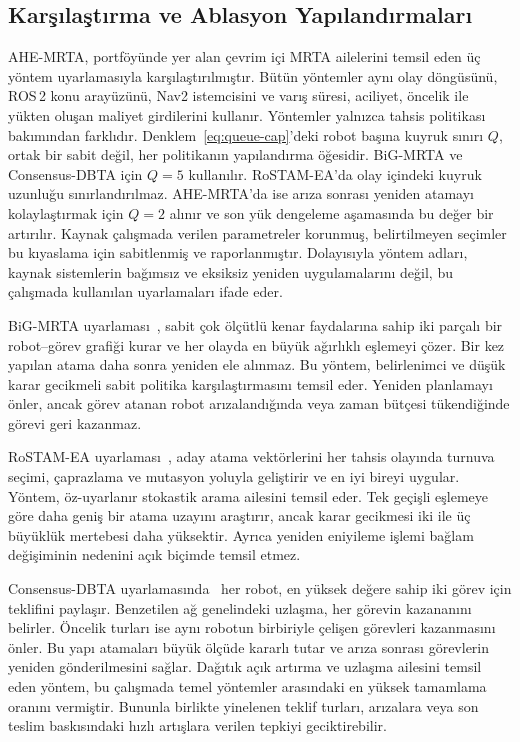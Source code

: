 \documentclass[10pt,letterpaper,onecolumn]{IEEEtran}
\begin{document}
\subsection{Karşılaştırma ve Ablasyon Yapılandırmaları}
\label{sec:baselines}
AHE-MRTA, portföyünde yer alan çevrim içi MRTA ailelerini temsil eden üç yöntem
uyarlamasıyla karşılaştırılmıştır. Bütün yöntemler aynı olay döngüsünü, ROS\,2
konu arayüzünü, Nav2 istemcisini ve varış süresi, aciliyet, öncelik ile yükten
oluşan maliyet girdilerini kullanır. Yöntemler yalnızca tahsis politikası
bakımından farklıdır. Denklem~\eqref{eq:queue-cap}'deki robot başına kuyruk
sınırı $Q$, ortak bir sabit değil, her politikanın yapılandırma öğesidir.
BiG-MRTA ve Consensus-DBTA için $Q{=}5$ kullanılır. RoSTAM-EA'da olay içindeki
kuyruk uzunluğu sınırlandırılmaz. AHE-MRTA'da ise arıza sonrası yeniden atamayı
kolaylaştırmak için $Q{=}2$ alınır ve son yük dengeleme aşamasında bu değer bir
artırılır. Kaynak çalışmada verilen parametreler korunmuş, belirtilmeyen
seçimler bu kıyaslama için sabitlenmiş ve raporlanmıştır. Dolayısıyla yöntem
adları, kaynak sistemlerin bağımsız ve eksiksiz yeniden uygulamalarını değil,
bu çalışmada kullanılan uyarlamaları ifade eder.

BiG-MRTA uyarlaması~\cite{ghassemi2022bigmrta}, sabit çok ölçütlü kenar
faydalarına sahip iki parçalı bir robot--görev grafiği kurar ve her olayda en
büyük ağırlıklı eşlemeyi çözer. Bir kez yapılan atama daha sonra yeniden ele
alınmaz. Bu yöntem, belirlenimci ve düşük karar gecikmeli sabit politika
karşılaştırmasını temsil eder. Yeniden planlamayı önler, ancak görev atanan
robot arızalandığında veya zaman bütçesi tükendiğinde görevi geri kazanmaz.

RoSTAM-EA uyarlaması~\cite{rostam2024selfadaptive}, aday atama vektörlerini her
tahsis olayında turnuva seçimi, çaprazlama ve mutasyon yoluyla geliştirir ve en
iyi bireyi uygular. Yöntem, öz-uyarlanır stokastik arama ailesini temsil eder.
Tek geçişli eşlemeye göre daha geniş bir atama uzayını araştırır, ancak karar
gecikmesi iki ile üç büyüklük mertebesi daha yüksektir. Ayrıca yeniden
eniyileme işlemi bağlam değişiminin nedenini açık biçimde temsil etmez.

Consensus-DBTA uyarlamasında~\cite{mahato2023consensus} her robot, en yüksek
değere sahip iki görev için teklifini paylaşır. Benzetilen ağ genelindeki
uzlaşma, her görevin kazananını belirler. Öncelik turları ise aynı robotun
birbiriyle çelişen görevleri kazanmasını önler. Bu yapı atamaları büyük ölçüde
kararlı tutar ve arıza sonrası görevlerin yeniden gönderilmesini sağlar.
Dağıtık açık artırma ve uzlaşma ailesini temsil eden yöntem, bu çalışmada temel
yöntemler arasındaki en yüksek tamamlama oranını vermiştir. Bununla birlikte
yinelenen teklif turları, arızalara veya son teslim baskısındaki hızlı artışlara
verilen tepkiyi geciktirebilir.
\end{document}
